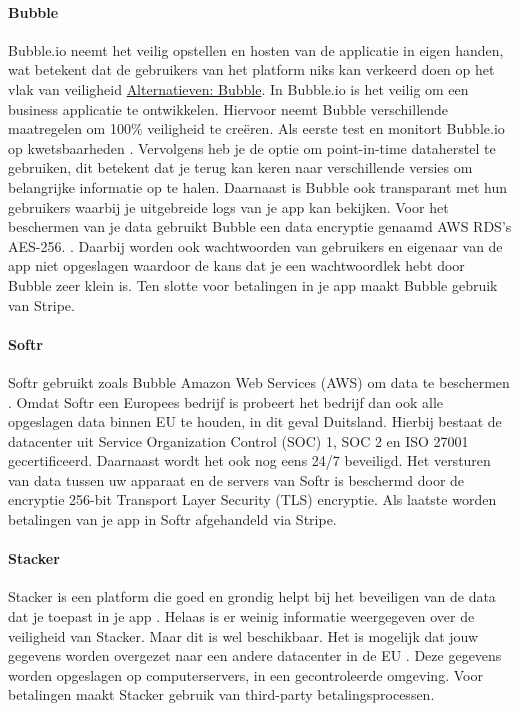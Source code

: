 \paragraph{Bubble}
Bubble.io neemt het veilig opstellen en hosten van de applicatie in eigen handen, wat betekent dat de gebruikers van het platform niks kan verkeerd doen op het vlak van veiligheid \hyperref[subsec:alternatieve-platformen]{Alternatieven: Bubble}.
In Bubble.io is het veilig om een business applicatie te ontwikkelen. Hiervoor neemt Bubble verschillende maatregelen om 100\% veiligheid te creëren. 
Als eerste test en monitort Bubble.io op kwetsbaarheden \autocite{Agency2023}. Vervolgens heb je de optie om point-in-time dataherstel te gebruiken, dit betekent dat je terug kan keren naar verschillende versies om belangrijke informatie op te halen. Daarnaast is Bubble ook transparant met hun gebruikers waarbij je uitgebreide logs van je app kan bekijken. Voor het beschermen van je data gebruikt Bubble een data encryptie genaamd AWS RDS’s AES-256. . Daarbij worden ook wachtwoorden van gebruikers en eigenaar van de app niet opgeslagen waardoor de kans dat je een wachtwoordlek hebt door Bubble zeer klein is. Ten slotte voor betalingen in je app maakt Bubble gebruik van Stripe.
\paragraph{Softr}
Softr gebruikt zoals Bubble Amazon Web Services (AWS) om data te beschermen \autocite{Softr}. Omdat Softr een Europees bedrijf is probeert het bedrijf dan ook alle opgeslagen data binnen EU te houden, in dit geval Duitsland. Hierbij bestaat de datacenter uit Service Organization Control (SOC) 1, SOC 2 en ISO 27001 gecertificeerd. Daarnaast wordt het ook nog eens 24/7 beveiligd. Het versturen van data tussen uw apparaat en de servers van 
Softr is beschermd door de encryptie 256-bit Transport Layer Security (TLS) encryptie. Als laatste worden betalingen van je app in Softr afgehandeld via Stripe.
\paragraph{Stacker}
Stacker is een platform die goed en grondig helpt bij het beveiligen van de data dat je toepast in je app \autocite{JDN2023}.
 Helaas is er weinig informatie weergegeven over de veiligheid van Stacker. Maar dit is wel beschikbaar.
 Het is mogelijk dat jouw gegevens worden overgezet naar een andere datacenter in de EU \autocite{Stacker2023}. 
 Deze gegevens worden opgeslagen op computerservers, in een gecontroleerde omgeving. Voor betalingen maakt Stacker gebruik van third-party betalingsprocessen.

